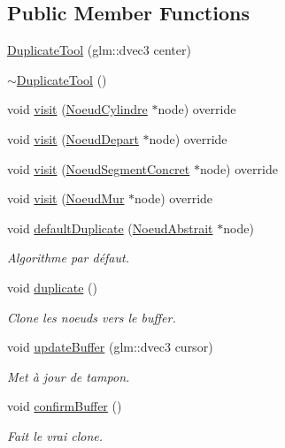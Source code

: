 \subsection*{Public Member Functions}
\begin{DoxyCompactItemize}
\item 
\hyperlink{group__inf2990_ga13dd0524e005f4a44dbaeea9f237d761}{Duplicate\+Tool} (glm\+::dvec3 center)
\item 
\hyperlink{group__inf2990_gaab141bc62b424e5e0bfc48bd899bcb8a}{$\sim$\+Duplicate\+Tool} ()
\item 
void \hyperlink{group__inf2990_gab91de27487440694048c1a0fbcc74da7}{visit} (\hyperlink{class_noeud_cylindre}{Noeud\+Cylindre} $\ast$node) override
\item 
void \hyperlink{group__inf2990_ga5fa8bbf01a90c95062c8104ebdf5bb62}{visit} (\hyperlink{class_noeud_depart}{Noeud\+Depart} $\ast$node) override
\item 
void \hyperlink{group__inf2990_gaa8f5663adbfe6f00a2c2f79083339e30}{visit} (\hyperlink{class_noeud_segment_concret}{Noeud\+Segment\+Concret} $\ast$node) override
\item 
void \hyperlink{group__inf2990_ga9b9e4456490e59603f3d8924fdf19c18}{visit} (\hyperlink{class_noeud_mur}{Noeud\+Mur} $\ast$node) override
\item 
void \hyperlink{group__inf2990_ga4708caab32b10170d24dba25d4829677}{default\+Duplicate} (\hyperlink{class_noeud_abstrait}{Noeud\+Abstrait} $\ast$node)
\begin{DoxyCompactList}\small\item\em Algorithme par défaut. \end{DoxyCompactList}\item 
\hypertarget{group__inf2990_gadbe76417e934ddabc6df18141162fe2c}{}void \hyperlink{group__inf2990_gadbe76417e934ddabc6df18141162fe2c}{duplicate} ()\label{group__inf2990_gadbe76417e934ddabc6df18141162fe2c}

\begin{DoxyCompactList}\small\item\em Clone les noeuds vers le buffer. \end{DoxyCompactList}\item 
void \hyperlink{group__inf2990_ga2fad36673e41afac22177ca37c6c75ff}{update\+Buffer} (glm\+::dvec3 cursor)
\begin{DoxyCompactList}\small\item\em Met à jour de tampon. \end{DoxyCompactList}\item 
void \hyperlink{group__inf2990_ga69fcbb20577c85049ca9a5ca8b37091d}{confirm\+Buffer} ()
\begin{DoxyCompactList}\small\item\em Fait le vrai clone. \end{DoxyCompactList}\end{DoxyCompactItemize}


